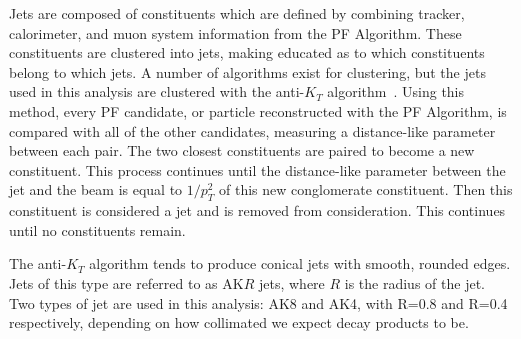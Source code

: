 Jets are composed of constituents which are defined by combining tracker, calorimeter, and muon system information from the PF Algorithm. These constituents are clustered into jets, making educated as to which constituents belong to which jets. A number of algorithms exist for clustering, but the jets used in this analysis are clustered with the anti-$K_{T}$ algorithm~\cite{Cacciari:2008gp}. Using this method, every PF candidate, or particle reconstructed with the PF Algorithm, is compared with all of the other candidates, measuring a distance-like parameter between each pair. The two closest constituents are paired to become a new constituent. This process continues until the distance-like parameter between the jet and the beam is equal to $1/p_T^2$ of this new conglomerate constituent. Then this constituent is considered a jet and is removed from consideration. This continues until no constituents remain.

The anti-$K_{T}$ algorithm tends to produce conical jets with smooth, rounded edges. Jets of this type are referred to as AK$R$ jets, where $R$ is the radius of the jet. Two types of jet are used in this analysis: AK8 and AK4, with R=0.8 and R=0.4 respectively, depending on how collimated we expect decay products to be.


\vspace{5mm}

